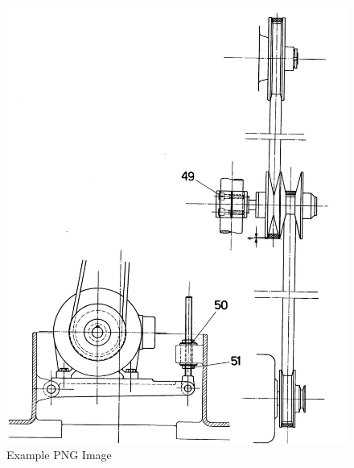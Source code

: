 \newpage
\begin{figure}[h]
    \centering
    \includegraphics[width=1.0\linewidth]{./images/page_25}
    \caption{Example PNG Image}
    \label{fig:belt_tensioning}
\end{figure}

